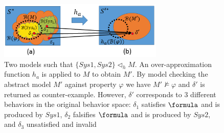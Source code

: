 \begin{figure}[!t]
		\centering
		\includegraphics[width=0.7\textwidth]{figs/distinction.png}
		\caption{\small Two models such that $\{Sys1,Sys2\}\triangleleft_h M$. An over-approximation function $h_a$ is applied to $M$ to obtain $M'$. By model checking the abstract model $M'$ against property $\varphi$ we have $M'\not\models\varphi$ and $\delta'$ is returned as counter-example. However, $\delta'$ corresponds to 3 different behaviors in the original behavior space: $\delta_1$ satisfies $\formula$ and is produced by $Sys1$, $\delta_2$ falsifies $\formula$ and is produced by $Sys2$, and $\delta_3$ unsatisfied and invalid}
		\label{fig:ambiguity}
\end{figure}


